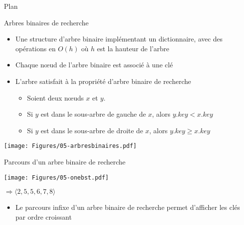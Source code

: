 \begin{frame}{Plan}

\tableofcontents[currentsection]

\end{frame}


\begin{frame}{Arbres binaires de recherche}

\begin{itemize}
\item Une structure d'arbre binaire implémentant un dictionnaire, avec
  des opérations en $O(h)$ où $h$ est la hauteur de l'arbre


\bigskip

\item Chaque n\oe ud de l'arbre binaire est associé à une clé
\item L'arbre satisfait à la propriété d'arbre binaire de recherche
\begin{itemize}
\item Soient deux n\oe uds $x$ et $y$.
\item Si $y$ est dans le sous-arbre de gauche de $x$, alors $y.key<x.key$
\item Si $y$ est dans le sous-arbre de droite de $x$, alors $y.key\geq x.key$
\end{itemize}
\end{itemize}

\centerline{\texttt{[image: Figures/05-arbresbinaires.pdf]}}

\end{frame}

\begin{frame}{Parcours d'un arbre binaire de recherche}

\begin{center}
\texttt{[image: Figures/05-onebst.pdf]}
\bigskip

$\Rightarrow \langle 2, 5, 5, 6, 7, 8\rangle$
\end{center}

\begin{itemize}
\item Le parcours infixe d'un arbre binaire de recherche permet d'afficher les clés par ordre croissant

\bigskip
\begin{center}
\begin{small}
\end{small}
\end{center}

\end{itemize}

\end{frame}

